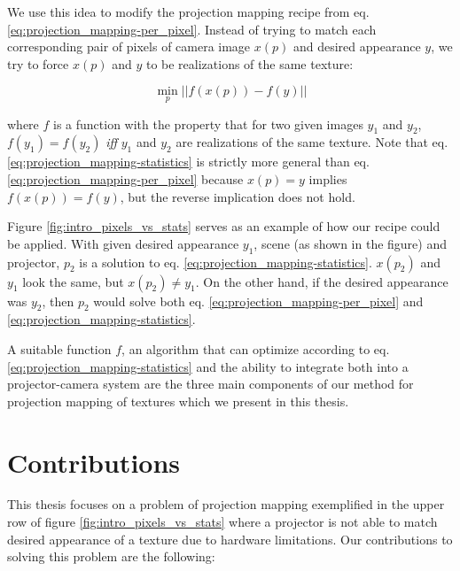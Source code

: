 We use this idea to modify the projection mapping recipe from eq. \ref{eq:projection_mapping-per_pixel}. Instead of trying to match each corresponding pair of pixels of camera image \(x(p)\) and desired appearance \(y\), we try to force \(x(p)\) and \(y\) to be realizations of the same texture:

\begin{equation}
    \label{eq:projection_mapping-statistics}
    \min_p || f(x(p)) - f(y) ||
\end{equation}

where \(f\) is a function with the property that for two given images \(y_1\) and \(y_2\), \(f(y_1) = f(y_2)\) \textit{iff} \(y_1\) and \(y_2\) are realizations of the same texture. Note that eq. \ref{eq:projection_mapping-statistics} is strictly more general than eq. \ref{eq:projection_mapping-per_pixel} because \(x(p) = y\) implies \(f(x(p)) = f(y)\), but the reverse implication does not hold.

Figure \ref{fig:intro_pixels_vs_stats} serves as an example of how our recipe could be applied. With given desired appearance \(y_1\), scene (as shown in the figure) and projector, \(p_2\) is a solution to eq. \ref{eq:projection_mapping-statistics}. \(x(p_2)\) and \(y_1\) look the same, but \(x(p_2) \neq y_1\). On the other hand, if the desired appearance was \(y_2\), then \(p_2\) would solve both eq. \ref{eq:projection_mapping-per_pixel} and \ref{eq:projection_mapping-statistics}.

A suitable function \(f\), an algorithm that can optimize according to eq. \ref{eq:projection_mapping-statistics} and the ability to integrate both into a projector-camera system are the three main components of our method for projection mapping of textures which we present in this thesis.

\section{Contributions}
\label{section:intro-contributions}

This thesis focuses on a problem of projection mapping exemplified in the upper row of figure \ref{fig:intro_pixels_vs_stats} where a projector is not able to match desired appearance of a texture due to hardware limitations. Our contributions to solving this problem are the following:

